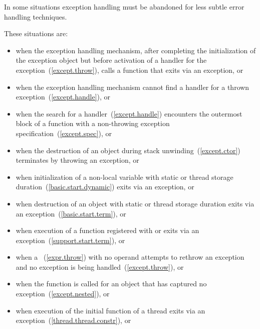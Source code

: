 \pnum
{}%
In some situations exception handling must be abandoned
for less subtle error handling techniques. \begin{note} These situations are:

%
\begin{itemize}
\item%
when the exception handling mechanism, after completing
the initialization of the exception object
but before
activation of a handler for the exception~(\ref{except.throw}),
calls a function that exits
via an exception, or

\item%
when the exception handling mechanism cannot find a handler for a thrown exception~(\ref{except.handle}), or

\item when the search for a handler~(\ref{except.handle}) encounters the
outermost block of a function
with a non-throwing exception specification~(\ref{except.spec}), or

\item%
when the destruction of an object during stack unwinding~(\ref{except.ctor})
terminates by throwing an exception, or

\item%
when initialization of a non-local
variable with static or thread storage duration~(\ref{basic.start.dynamic})
exits via an exception, or

\item%
when destruction of an object with static or thread storage duration exits
via an exception~(\ref{basic.start.term}), or

\item%
when execution of a function registered with
 or 
exits via an exception~(\ref{support.start.term}), or

\item%
when a
~(\ref{expr.throw})
with no operand attempts to rethrow an exception and no exception is being
handled~(\ref{except.throw}), or

\item%
when the function  is called for an object
that has captured no exception~(\ref{except.nested}), or

\item%
when execution of the initial function of a thread exits via
an exception~(\ref{thread.thread.constr}), or


\end{itemize}
\end{note}
